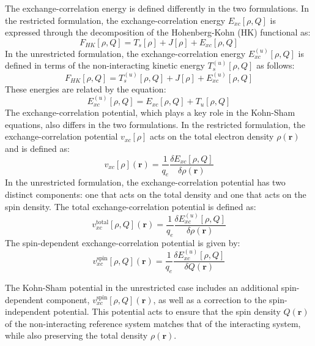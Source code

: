 \documentclass[%
 preprint, linenumbers,
 amsmath,amssymb,
 aps, physrev,
]{revtex4-2}
\begin{document}
The exchange-correlation energy is defined differently in the two formulations. In the restricted formulation, the exchange-correlation energy \(E_{xc}[\rho, Q]\) is expressed through the decomposition of the Hohenberg-Kohn (HK) functional as:
\begin{equation}
    F_{HK}[\rho, Q] = T_s[\rho] + J[\rho] + E_{xc}[\rho, Q]
\end{equation}
In the unrestricted formulation, the exchange-correlation energy \(E_{xc}^{(u)}[\rho, Q]\) is defined in terms of the non-interacting kinetic energy \(T_s^{(u)}[\rho, Q]\) as follows:
\begin{equation}
    F_{HK}[\rho, Q] = T_s^{(u)}[\rho, Q] + J[\rho] + E_{xc}^{(u)}[\rho, Q]
\end{equation}
These energies are related by the equation:
\begin{equation}
     E_{xc}^{(u)}[\rho, Q] = E_{xc}[\rho, Q] + T_u[\rho, Q]
\end{equation}
The exchange-correlation potential, which plays a key role in the Kohn-Sham equations, also differs in the two formulations. In the restricted formulation, the exchange-correlation potential \(v_{xc}[\rho]\) acts on the total electron density \(\rho( \mathbf{r})\) and is defined as:
\begin{equation}
    v_{xc}[\rho](\mathbf{r}) = \frac{1}{q_e} \frac{\delta E_{xc}[\rho, Q]}{\delta \rho(\mathbf{r})}
\end{equation}
In the unrestricted formulation, the exchange-correlation potential has two distinct components: one that acts on the total density and one that acts on the spin density. The total exchange-correlation potential is defined as:
\begin{equation}
    v_{xc}^{\text{total}}[\rho, Q](\mathbf{r}) = \frac{1}{q_e} \frac{\delta E_{xc}^{(u)}[\rho, Q]}{\delta \rho(\mathbf{r})}
\end{equation}
The spin-dependent exchange-correlation potential is given by:
\begin{equation}
     v_{xc}^{\text{spin}}[\rho, Q](\mathbf{r}) = \frac{1}{q_e} \frac{\delta E_{xc}^{(u)}[\rho, Q]}{\delta Q(\mathbf{r})}
\end{equation}

The Kohn-Sham potential in the unrestricted case includes an additional spin-dependent component, \(v_{xc}^{\text{spin}}[\rho, Q](\mathbf{r})\), as well as a correction to the spin-independent potential. This potential acts to ensure that the spin density \(Q(\mathbf{r})\) of the non-interacting reference system matches that of the interacting system, while also preserving the total density \(\rho(\mathbf{r})\).
\end{document}
